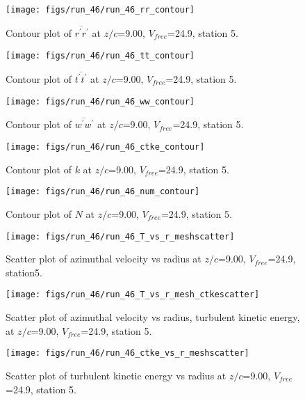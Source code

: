\begin{figure}[H]
\centering
\texttt{[image: figs/run\_46/run\_46\_rr\_contour]}
\caption{Contour plot of $\overline{r^\prime r^\prime}$ at $z/c$=9.00, $V_{free}$=24.9, station 5.}
\label{fig:run_46_rr_contour}
\end{figure}


\begin{figure}[H]
\centering
\texttt{[image: figs/run\_46/run\_46\_tt\_contour]}
\caption{Contour plot of $\overline{t^\prime t^\prime}$ at $z/c$=9.00, $V_{free}$=24.9, station 5.}
\label{fig:run_46_tt_contour}
\end{figure}


\begin{figure}[H]
\centering
\texttt{[image: figs/run\_46/run\_46\_ww\_contour]}
\caption{Contour plot of $\overline{w^\prime w^\prime}$ at $z/c$=9.00, $V_{free}$=24.9, station 5.}
\label{fig:run_46_ww_contour}
\end{figure}


\begin{figure}[H]
\centering
\texttt{[image: figs/run\_46/run\_46\_ctke\_contour]}
\caption{Contour plot of $k$ at $z/c$=9.00, $V_{free}$=24.9, station 5.}
\label{fig:run_46_ctke_contour}
\end{figure}


\begin{figure}[H]
\centering
\texttt{[image: figs/run\_46/run\_46\_num\_contour]}
\caption{Contour plot of $N$ at $z/c$=9.00, $V_{free}$=24.9, station 5.}
\label{fig:run_46_num_contour}
\end{figure}


\begin{figure}[H]
\centering
\texttt{[image: figs/run\_46/run\_46\_T\_vs\_r\_meshscatter]}
\caption{Scatter plot of azimuthal velocity vs radius at $z/c$=9.00, $V_{free}$=24.9, station5.}
\label{fig:run_46_T_vs_r_meshscatter}
\end{figure}


\begin{figure}[H]
\centering
\texttt{[image: figs/run\_46/run\_46\_T\_vs\_r\_mesh\_ctkescatter]}
\caption{Scatter plot of azimuthal velocity vs radius, turbulent kinetic energy, at $z/c$=9.00, $V_{free}$=24.9, station 5.}
\label{fig:run_46_T_vs_r_mesh_ctkescatter}
\end{figure}


\begin{figure}[H]
\centering
\texttt{[image: figs/run\_46/run\_46\_ctke\_vs\_r\_meshscatter]}
\caption{Scatter plot of turbulent kinetic energy vs radius at $z/c$=9.00, $V_{free}$=24.9, station 5.}
\label{fig:run_46_ctke_vs_r_meshscatter}
\end{figure}


